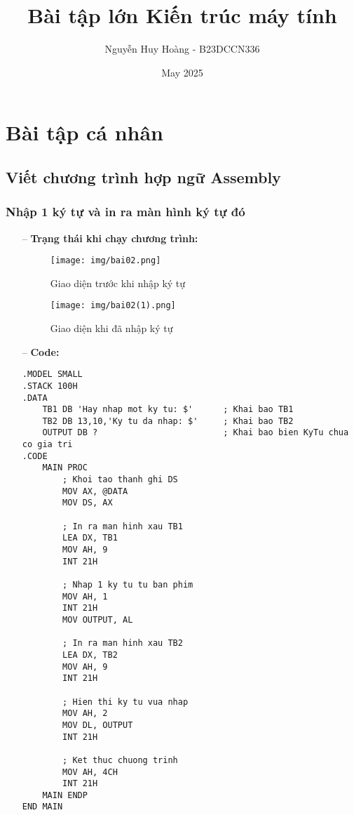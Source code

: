 \documentclass{article}
\begin{document}
\title{\textbf{Bài tập lớn Kiến trúc máy tính}}
\author{Nguyễn Huy Hoàng - B23DCCN336}
\date{May 2025}

\maketitle
\section{Bài tập cá nhân}

\subsection{Viết chương trình hợp ngữ Assembly}

\subsubsection{Nhập 1 ký tự và in ra màn hình ký tự đó}

\begin{itemize}
\item[--]\textbf{Trạng thái khi chạy chương trình:}

\begin{figure}[H]
    \centering
    \texttt{[image: img/bai02.png]}
    \caption{Giao diện trước khi nhập ký tự}
    \label{fig:before_input}
\end{figure}

\begin{figure}[H]
    \centering
    \texttt{[image: img/bai02(1).png]}
    \caption{Giao diện khi đã nhập ký tự}
    \label{fig:after_input}
\end{figure}
\newpage
\item[--]\textbf{Code:}
\begin{lstlisting}[caption={Nhập 1 ký tự và in ra màn hình ký tự đó}]
.MODEL SMALL
.STACK 100H
.DATA
    TB1 DB 'Hay nhap mot ky tu: $'      ; Khai bao TB1
    TB2 DB 13,10,'Ky tu da nhap: $'     ; Khai bao TB2
    OUTPUT DB ?                         ; Khai bao bien KyTu chua co gia tri
.CODE
    MAIN PROC
        ; Khoi tao thanh ghi DS
        MOV AX, @DATA
        MOV DS, AX
    
        ; In ra man hinh xau TB1
        LEA DX, TB1
        MOV AH, 9
        INT 21H
    
        ; Nhap 1 ky tu tu ban phim
        MOV AH, 1
        INT 21H
        MOV OUTPUT, AL
    
        ; In ra man hinh xau TB2
        LEA DX, TB2
        MOV AH, 9
        INT 21H
    
        ; Hien thi ky tu vua nhap
        MOV AH, 2
        MOV DL, OUTPUT
        INT 21H
    
        ; Ket thuc chuong trinh
        MOV AH, 4CH
        INT 21H
    MAIN ENDP
END MAIN
\end{lstlisting}
\end{itemize}
\end{document}
